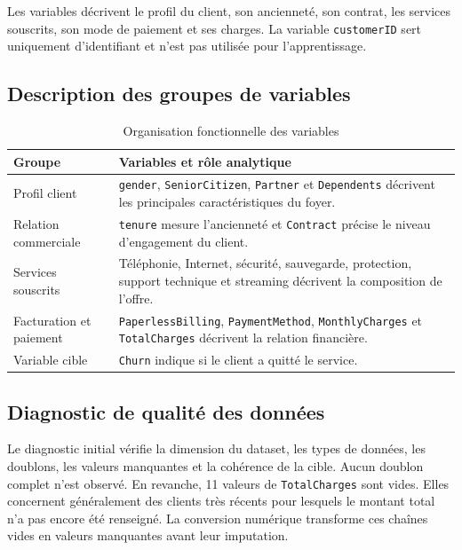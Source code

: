 \documentclass[12pt, a4paper]{article}
\begin{document}
Les variables décrivent le profil du client, son ancienneté, son contrat, les
services souscrits, son mode de paiement et ses charges. La variable
\texttt{customerID} sert uniquement d'identifiant et n'est pas utilisée pour
l'apprentissage.

\subsection{Description des groupes de variables}

\begin{table}[H]
\centering
\caption{Organisation fonctionnelle des variables}
\begin{tabularx}{\textwidth}{p{}X}
\toprule
\textbf{Groupe} & \textbf{Variables et rôle analytique}\\
\midrule
Profil client &
\texttt{gender}, \texttt{SeniorCitizen}, \texttt{Partner} et
\texttt{Dependents} décrivent les principales caractéristiques du foyer.\\
Relation commerciale &
\texttt{tenure} mesure l'ancienneté et \texttt{Contract} précise le niveau
d'engagement du client.\\
Services souscrits &
Téléphonie, Internet, sécurité, sauvegarde, protection, support technique et
streaming décrivent la composition de l'offre.\\
Facturation et paiement &
\texttt{PaperlessBilling}, \texttt{PaymentMethod},
\texttt{MonthlyCharges} et \texttt{TotalCharges} décrivent la relation
financière.\\
Variable cible &
\texttt{Churn} indique si le client a quitté le service.\\
\bottomrule
\end{tabularx}
\end{table}

\subsection{Diagnostic de qualité des données}

Le diagnostic initial vérifie la dimension du dataset, les types de données,
les doublons, les valeurs manquantes et la cohérence de la cible. Aucun doublon
complet n'est observé. En revanche, 11 valeurs de \texttt{TotalCharges} sont
vides. Elles concernent généralement des clients très récents pour lesquels le
montant total n'a pas encore été renseigné. La conversion numérique transforme
ces chaînes vides en valeurs manquantes avant leur imputation.
\end{document}
